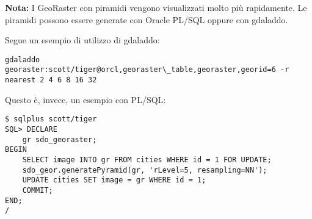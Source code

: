 \textbf{Nota:} I GeoRaster con piramidi vengono visualizzati molto più rapidamente. Le piramidi possono essere 
generate con Oracle PL/SQL oppure con gdaladdo.

Segue un esempio di utilizzo di gdaladdo:

\begin{verbatim}
gdaladdo georaster:scott/tiger@orcl,georaster\_table,georaster,georid=6 -r 
nearest 2 4 6 8 16 32
\end{verbatim}

Questo è, invece, un esempio con PL/SQL: 
\begin{verbatim}
$ sqlplus scott/tiger
SQL> DECLARE
    gr sdo_georaster;
BEGIN
    SELECT image INTO gr FROM cities WHERE id = 1 FOR UPDATE;
    sdo_geor.generatePyramid(gr, 'rLevel=5, resampling=NN');
    UPDATE cities SET image = gr WHERE id = 1;
    COMMIT;
END;
/
\end{verbatim}

\FloatBarrier
